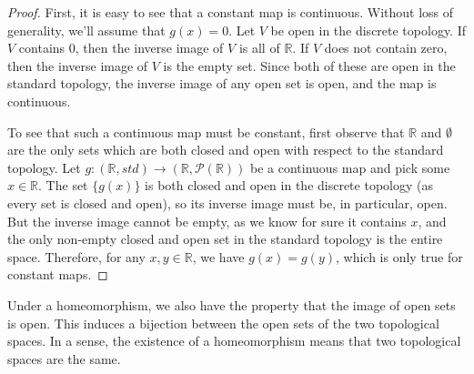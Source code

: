 \begin{proof}
 	
 	First, it is easy to see that a constant map is continuous.  Without loss of generality, we'll assume that $g(x)=0$.  Let $V$ be open in the discrete topology.  If $V$ contains $0$, then the inverse image of $V$ is all of $\mathbb{R}$.  If $V$ does not contain zero, then the inverse image of $V$ is the empty set.  Since both of these are open in the standard topology, the inverse image of any open set is open, and the map is continuous.
 	
 	To see that such a continuous map must be constant, first observe that $\mathbb{R}$ and $\emptyset$ are the only sets which are both closed and open with respect to the standard topology.  Let $g: (\mathbb{R},std)\rightarrow (\mathbb{R},\mathcal{P}(\mathbb{R})) $ be a continuous map and pick some $x\in \mathbb{R}$.  The set $\{g(x)\}$ is both closed and open in the discrete topology (as every set is closed and open), so its inverse image must be, in particular, open.  But the inverse image cannot be empty, as we know for sure it contains $x$, and the only non-empty closed and open set in the standard topology is the entire space.  Therefore, for any $x,y\in\mathbb{R}$, we have $g(x)=g(y)$, which is only true for constant maps.
 	
 	
 \end{proof}
 
 
 
 
 
 
 Under a homeomorphism, we also have the property that the image of open sets is open.  This induces a bijection between the open sets of the two topological spaces.  In a sense, the existence of a homeomorphism means that two topological spaces are the same.
 
 
